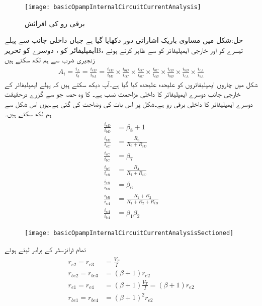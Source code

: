 \begin{figure}
\centering
\texttt{[image: basicOpampInternalCircuitCurrentAnalysis]}
\caption{برقی رو کی افزائش}
\label{شکل_تفرقی_حسابی_برقی_رو_افزائش}
\end{figure}
حل:شکل  میں مساوی باریک اشاراتی دور دکھایا گیا ہے جہاں داخلی جانب سے پہلے ایمپلیفائر کو ، دوسرے کو تحریر{B}، تیسرے کو  اور خارجی ایمپلیفائر کو  سے ظاہر کرتے ہوئے زنجیری ضرب سے ہم لکھ سکتے ہیں
\begin{align}\label{مساوات_تفرقی_ڈارلنگٹن_افزائش_رو_کی_بنیادی_زنجیری_مساوات}
A_i=\frac{i_L}{i_b}=\frac{i_{eD}}{i_{bA}}=\frac{i_{eD}}{i_{bD}} \times \frac{i_{bD}}{i_{cC}} \times \frac{i_{cC}}{i_{bC}} \times \frac{i_{bC}}{i_{cB}} \times \frac{i_{cB}}{i_{bB}} \times \frac{i_{bB}}{i_{cA}} \times \frac{i_{cA}}{i_{bA}}
\end{align}
شکل  میں چاروں ایمپلیفائروں کو علیحدہ علیحدہ کیا گیا ہے۔آپ دیکھ سکتے ہیں کہ پہلے ایمپلیفائر کے خارجی جانب دوسرے ایمپلیفائر کا داخلی مزاحمت  نسب ہے۔ کا وہ حصہ جو  سے گزرے درحقیقت دوسرے ایمپلیفائر کا داخلی برقی رو  ہے۔شکل پر اس بات کی وضاحت کی گئی ہے۔یوں اس شکل سے ہم لکھ سکتے ہیں۔ 
\begin{gather}
\begin{aligned}\label{مساوت_تفرقی_ڈارلنگٹن_تمام_کسر}
\frac{i_{eD}}{i_{bD}}&=\beta_8+1\\
\frac{i_{bD}}{i_{cC}}&=\frac{R_6}{R_6+R_{iD}}\\
\frac{i_{cC}}{i_{bC}}&=\beta_7\\
\frac{i_{bC}}{i_{cB}}&=\frac{R_4}{R_4+R_{iC}}\\
\frac{i_{cB}}{i_{bB}}&=\beta_6\\
\frac{i_{bB}}{i_{cA}}&=\frac{R_1+R_2}{R_1+R_2+R_{iB}}\\
\frac{i_{cA}}{i_{bA}}&= \beta_1 \beta_2
\end{aligned}
\end{gather}
%
\begin{figure}
\centering
\texttt{[image: basicOpampInternalCircuitCurrentAnalysisSectioned]}
\caption{}
\label{شکل_تفرقی_حسابی_برقی_رو_افزائش_الف}
\end{figure}
تمام ٹرانزسٹر کے  برابر لیتے ہوئے
\begin{gather}
\begin{aligned}
r_{e2}=r_{e3}&=\frac{V_T}{I}\\
r_{be2}=r_{be3}&=\left(\beta+1 \right) r_{e2}\\
r_{e1}=r_{e4}&=\left(\beta+1 \right) \frac{V_T}{I} =\left(\beta+1 \right)r_{e2}\\
r_{be1}=r_{be4}&=\left(\beta+1 \right)^2 r_{e2}
\end{aligned}
\end{gather}
